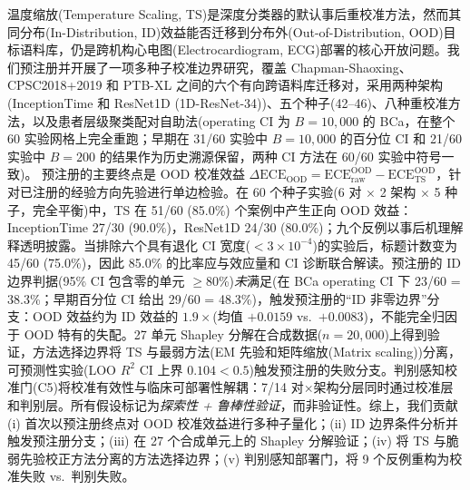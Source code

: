 温度缩放(Temperature Scaling, TS)是深度分类器的默认事后重校准方法，然而其同分布(In-Distribution, ID)效益能否迁移到分布外(Out-of-Distribution, OOD)目标语料库，仍是跨机构心电图(Electrocardiogram, ECG)部署的核心开放问题。我们预注册并开展了一项多种子校准边界研究，覆盖 Chapman-Shaoxing、CPSC2018+2019 和 PTB-XL 之间的六个有向跨语料库迁移对，采用两种架构(InceptionTime 和 ResNet1D (1D-ResNet-34))、五个种子(42--46)、八种重校准方法，以及患者层级聚类配对自助法(operating CI 为 $B=10{,}000$ 的 BCa，在整个 60 实验网格上完全重跑；早期在 31/60 实验中 $B=10{,}000$ 的百分位 CI 和 21/60 实验中 $B=200$ 的结果作为历史溯源保留，两种 CI 方法在 60/60 实验中符号一致)。
预注册的主要终点是 OOD 校准效益 $\Delta\text{ECE}_{\text{OOD}}=\text{ECE}_{\mathrm{raw}}^{\mathrm{OOD}}
-\text{ECE}_{\mathrm{TS}}^{\mathrm{OOD}}$，针对已注册的经验方向先验进行单边检验。在 60 个种子实验(6 对 $\times$ 2 架构 $\times$ 5 种子，完全平衡)中，TS 在 51/60 (85.0\%) 个案例中产生正向 OOD 效益：InceptionTime 27/30 (90.0\%)，ResNet1D 24/30 (80.0\%)；九个反例以事后机理解释透明披露。当排除六个具有退化 CI 宽度($<3\times10^{-4}$)的实验后，标题计数变为 45/60 (75.0\%)，因此 85.0\% 的比率应与效应量和 CI 诊断联合解读。预注册的 ID 边界判据(95\% CI 包含零的单元 $\geq$80\%)\emph{未}满足(在 BCa operating CI 下 23/60 = 38.3\%；早期百分位 CI 给出 29/60 = 48.3\%)，触发预注册的``ID 非零边界''分支：OOD 效益约为 ID 效益的 $1.9\times$(均值 $+0.0159$ vs.\ $+0.0083$)，不能完全归因于 OOD 特有的失配。27 单元 Shapley 分解在合成数据($n=20{,}000$)上得到验证，方法选择边界将 TS 与最弱方法(EM 先验和矩阵缩放(Matrix scaling))分离，可预测性实验(LOO $R^2$ CI 上界 $0.104<0.5$)触发预注册的失败分支。判别感知校准门(C5)将校准有效性与临床可部署性解耦：7/14 对$\times$架构分层同时通过校准层和判别层。所有假设标记为\emph{探索性 + 鲁棒性验证}，而非验证性。综上，我们贡献 (i) 首次以预注册终点对 OOD 校准效益进行多种子量化；(ii) ID 边界条件分析并触发预注册分支；(iii) 在 27 个合成单元上的 Shapley 分解验证；(iv) 将 TS 与脆弱先验校正方法分离的方法选择边界；(v) 判别感知部署门，将 9 个反例重构为校准失败 vs.\ 判别失败。
